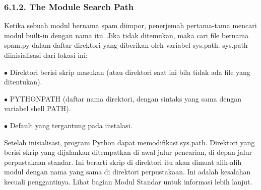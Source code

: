 \documentclass[a4paper,12pt]{report}
\begin{document}
\subsubsection*{6.1.2. The Module Search Path}
 \par
\noindent 
Ketika sebuah modul bernama spam diimpor, penerjemah pertama-tama mencari modul built-in dengan nama itu. Jika tidak ditemukan, maka cari file bernama spam.py dalam daftar direktori yang diberikan oleh variabel sys.path. sys.path diinisialisasi dari lokasi ini: \par
\noindent 
 $ \bullet $ Direktori berisi skrip masukan (atau direktori saat ini bila tidak ada file yang ditentukan). \par
\noindent 
 $ \bullet $ PYTHONPATH (daftar nama direktori, dengan sintaks yang sama dengan variabel shell PATH). \par
\noindent 
 $ \bullet $ Default yang tergantung pada instalasi. \par
\noindent 
Setelah inisialisasi, program Python dapat memodifikasi sys.path. Direktori yang berisi skrip yang dijalankan ditempatkan di awal jalur pencarian, di depan jalur perpustakaan standar. Ini berarti skrip di direktori itu akan dimuat alih-alih modul dengan nama yang sama di direktori perpustakaan. Ini adalah kesalahan kecuali penggantinya. Lihat bagian Modul Standar untuk informasi lebih lanjut. \par
\noindent 
\end{document}
